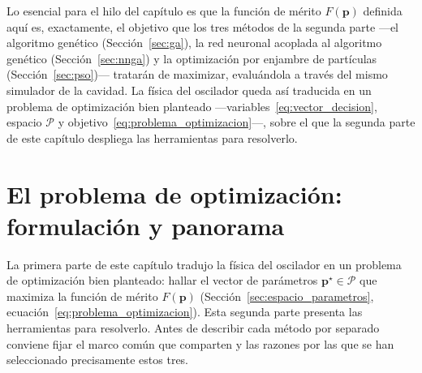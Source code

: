 Lo esencial para el hilo del capítulo es que la función de mérito $F(\mathbf{p})$
definida aquí es, exactamente, el objetivo que los tres métodos de la segunda parte
—el algoritmo genético (Sección~\ref{sec:ga}), la red neuronal acoplada al
algoritmo genético (Sección~\ref{sec:nnga}) y la optimización por enjambre de
partículas (Sección~\ref{sec:pso})— tratarán de maximizar, evaluándola a través del
mismo simulador de la cavidad. La física del oscilador queda así traducida en un
problema de optimización bien planteado —variables~\eqref{eq:vector_decision},
espacio $\mathcal{P}$ y objetivo~\eqref{eq:problema_optimizacion}—, sobre el que la
segunda parte de este capítulo despliega las herramientas para resolverlo.



\section{El problema de optimización: formulación y panorama}
\label{sec:opt_formulacion}

La primera parte de este capítulo tradujo la física del oscilador en un problema de
optimización bien planteado: hallar el vector de parámetros
$\mathbf{p}^{\star}\in\mathcal{P}$ que maximiza la función de mérito
$F(\mathbf{p})$ (Sección~\ref{sec:espacio_parametros},
ecuación~\eqref{eq:problema_optimizacion}). Esta segunda parte presenta las
herramientas para resolverlo. Antes de describir cada método por separado conviene
fijar el marco común que comparten y las razones por las que se han seleccionado
precisamente estos tres.


